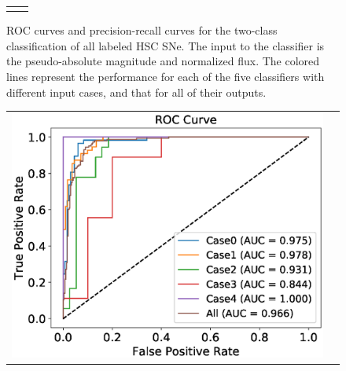 \documentclass[useamsfonts]{pasj01}
\begin{document}
\begin{figure}[htbp]
\begin{tabular}{cc}
\begin{minipage}{0.5\hsize}
\begin{center}
            \end{center}
        \end{minipage}
    \end{tabular}
    \vspace{2mm}
    \caption{%
    ROC curves and precision-recall curves for the two-class classification of all labeled HSC SNe.
    The input to the classifier is the pseudo-absolute magnitude and normalized flux.
    The colored lines represent the performance for each of the five classifiers with different input cases, and that for all of their outputs.
    }
    \label{fig:h2_test_all}
\end{figure}
%
%
%
\begin{figure}[htbp]
    \begin{tabular}{cc}
        \begin{minipage}{0.5\hsize}
            \begin{center}
                \includegraphics[width=\columnwidth]{figures/10_absolute-magnitude-scaled-flux-remove-y_SNdata_test_190522_ROC_noedge_spec.eps}
            \end{center}
        \end{minipage}
        \begin{minipage}{0.5\hsize}
            \begin{center}

\end{center}
\end{minipage}
\end{tabular}
\end{figure}
\end{document}
